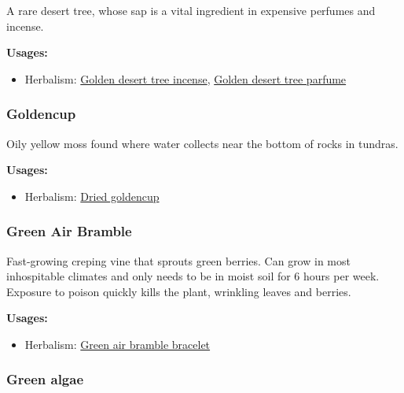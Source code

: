 A rare desert tree, whose sap is a vital ingredient in expensive perfumes and incense.

\vspace{5mm}

\textbf{Usages:}

\begin{itemize}[noitemsep]
\item[] Herbalism: \hyperref[Golden desert tree incense]{Golden desert tree incense}, \hyperref[Golden desert tree parfume]{Golden desert tree parfume}
\end{itemize}

\subsubsection{Goldencup}
\label{Goldencup}

Oily yellow moss found where water collects near the bottom of rocks in tundras.

\vspace{5mm}

\textbf{Usages:}

\begin{itemize}[noitemsep]
\item[] Herbalism: \hyperref[Dried goldencup]{Dried goldencup}
\end{itemize}

\subsubsection{Green Air Bramble}
\label{Green Air Bramble}

Fast-growing creping vine that sprouts green berries. Can grow in most inhospitable climates and only needs to be in moist soil for 6 hours per week. Exposure to poison quickly kills the plant, wrinkling leaves and berries.

\vspace{5mm}

\textbf{Usages:}

\begin{itemize}[noitemsep]
\item[] Herbalism: \hyperref[Green air bramble bracelet]{Green air bramble bracelet}
\end{itemize}

\subsubsection{Green algae}

